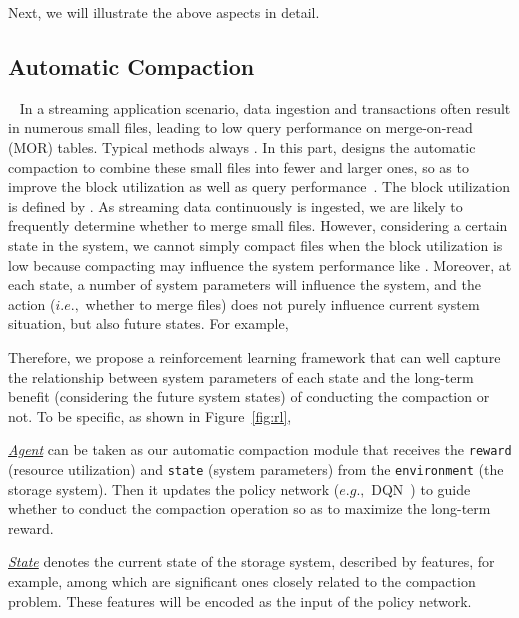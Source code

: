 Next, we will illustrate the above aspects in detail.


\subsection{Automatic Compaction}~\label{subsec:compaction}
In a streaming application scenario, data ingestion and transactions often result in numerous small files, leading to low query performance on merge-on-read (MOR) tables. Typical methods always .
In this part, \brain  designs the automatic compaction to combine these small files into fewer and larger ones, so as to  improve the block utilization  as well as query performance~. The block utilization is defined by . As streaming data continuously is ingested,  we are likely to frequently determine whether to merge small files. However, considering a certain state in the system, we cannot simply  compact files when the block utilization is low because compacting may influence the system performance like . Moreover,  at each state, a number of system parameters  will influence the system, and the action ($i.e.,$ whether to merge files) does not purely influence current system situation, but also future states. For example, 

Therefore, we propose a reinforcement learning framework that can well capture the relationship between system parameters of each state and the long-term benefit (considering the future system states) of conducting the compaction or not. 
To be specific, as shown in  Figure~\ref{fig:rl}, 

\noindent \underline{\textit{Agent}} can be taken as our automatic compaction module that receives the \texttt{reward} (resource utilization) and \texttt{state} (system parameters) from the \texttt{environment} (the storage system). Then it updates the policy network ($e.g.,$ DQN~\cite{}) to guide whether to conduct the compaction operation so as to maximize the long-term reward.

\noindent \underline{\textit{State}} denotes the current state of the storage system, described by  features, for example, among which  are significant ones closely  related to the compaction problem. These features will be encoded as the input of the policy network.


